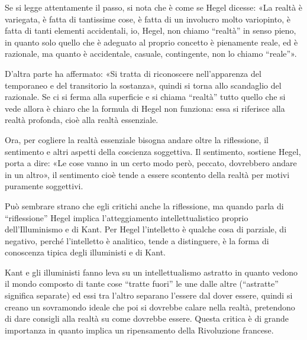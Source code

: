 \documentclass[a4paper,12pt,oneside,openany]{book}%
\begin{document}
Se si legge attentamente il passo, si nota che è come se Hegel dicesse: «La realtà è variegata, è fatta di tantissime cose, è fatta di un involucro molto variopinto, è fatta di tanti elementi accidentali, io, Hegel, non chiamo “realtà” in senso pieno, in quanto solo quello che è adeguato al proprio concetto è pienamente reale, ed è razionale, ma quanto è accidentale, casuale, contingente, non lo chiamo “reale”».

D’altra parte ha affermato: «Si tratta di riconoscere nell’apparenza del temporaneo e del transitorio la sostanza», quindi si torna allo scandaglio del razionale. Se ci si ferma alla superficie e si chiama “realtà” tutto quello che si vede allora è chiaro che la formula di Hegel non funziona: essa si riferisce alla realtà profonda, cioè alla realtà essenziale.

Ora, per cogliere la realtà essenziale bisogna andare oltre la riflessione, il sentimento e altri aspetti della coscienza soggettiva. Il sentimento, sostiene Hegel, porta a dire: «Le cose vanno in un certo modo però, peccato, dovrebbero andare in un altro», il sentimento cioè tende a essere scontento della realtà per motivi puramente soggettivi.

Può sembrare strano che egli critichi anche la riflessione, ma quando parla di “riflessione” Hegel implica l’atteggiamento intellettualistico proprio dell’Illuminismo e di Kant. Per Hegel l’intelletto è qualche cosa di parziale, di negativo, perché l’intelletto è analitico, tende a distinguere, è la forma di conoscenza tipica degli illuministi e di Kant.

Kant e gli illuministi fanno leva su un intellettualismo astratto in quanto vedono il mondo composto di tante cose “tratte fuori” le une dalle altre (“astratte” significa separate) ed essi tra l’altro separano l’essere dal dover essere, quindi si creano un sovramondo ideale che poi si dovrebbe calare nella realtà, pretendono di dare consigli alla realtà su come dovrebbe essere. Questa critica è di grande importanza in quanto implica un ripensamento della Rivoluzione francese.
\end{document}
